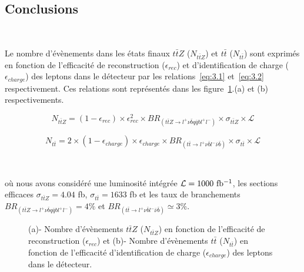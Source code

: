 \subsection{Conclusions}

~\par Le nombre d'\'ev\`enements dans les \'etats finaux $t\bar{t}Z$ ($N_{t\bar{t}Z}$) et $t\bar{t}$ ($N_{t\bar{t}}$) sont exprim\'es en fonction de l'efficacit\'e de reconstruction ($\epsilon_{rec}$) et d'identification de charge ($\epsilon_{charge}$) des leptons dans le
d\'etecteur par les relations~\eqref{eq:3.1} et~\eqref{eq:3.2} respectivement. Ces relations sont repr\'esent\'es dans les figure~\ref{figure:3.2}.(a) et (b) respectivements.

\begin{equation}
  \label{eq:3.1}
  N_{t\bar{t}Z}=(1-\epsilon_{rec}){\times}\epsilon_{rec}^2{\times}BR_{(t\bar{t}Z{\rightarrow}l^+{\nu}\bar{b}q\bar{q}bl^+l^-)}{\times}\sigma_{t\bar{t}Z}{\times}\mathcal{L}  
\end{equation}

\begin{equation}
  \label{eq:3.2}
  N_{t\bar{t}}=2{\times}(1-\epsilon_{charge}){\times}\epsilon_{charge}{\times}BR_{(t\bar{t}{\rightarrow}l^+{\nu}\bar{b}l^-\bar{\nu}\bar{b})}{\times}\sigma_{t\bar{t}}{\times}\mathcal{L}  
\end{equation}

~\par o\`u nous avons consid\'er\'e une luminosit\'e int\'egr\'ee $\mathcal{L}=1000\ \rm{fb^{-1}}$, les sections efficaces
$\sigma_{t\bar{t}Z}=4.04$ fb, $\sigma_{t\bar{t}}=1633$ fb et les taux de branchements $BR_{(t\bar{t}Z{\rightarrow}l^+{\nu}\bar{b}q\bar{q}bl^+l^-)}=4\%$ et $BR_{(t\bar{t}{\rightarrow}l^+{\nu}\bar{b}l^-\bar{\nu}\bar{b})} \simeq 3\%$.

\begin{figure}[H]
  \centering
  \quad
  \caption{(a)- Nombre d'\'ev\`enements $t\bar{t}Z$ ($N_{t\bar{t}Z}$) en fonction de l'efficacit\'e de reconstruction ($\epsilon_{rec}$) et (b)- Nombre d'\'ev\`enements $t\bar{t}$ ($N_{t\bar{t}}$) en fonction de l'efficacit\'e d'identification de charge ($\epsilon_{charge}$) des leptons dans le d\'etecteur.}
  \label{figure:3.2}
\end{figure}


